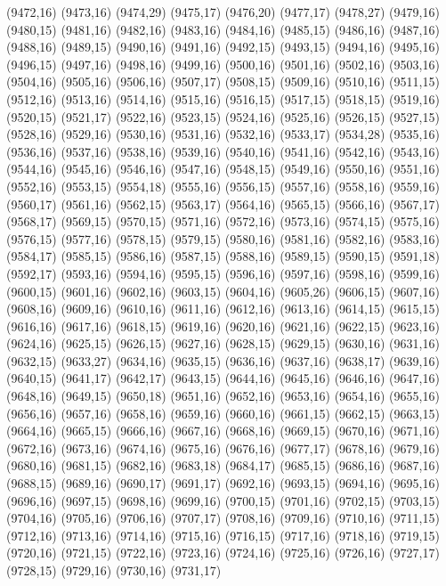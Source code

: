 (9472,16)
(9473,16)
(9474,29)
(9475,17)
(9476,20)
(9477,17)
(9478,27)
(9479,16)
(9480,15)
(9481,16)
(9482,16)
(9483,16)
(9484,16)
(9485,15)
(9486,16)
(9487,16)
(9488,16)
(9489,15)
(9490,16)
(9491,16)
(9492,15)
(9493,15)
(9494,16)
(9495,16)
(9496,15)
(9497,16)
(9498,16)
(9499,16)
(9500,16)
(9501,16)
(9502,16)
(9503,16)
(9504,16)
(9505,16)
(9506,16)
(9507,17)
(9508,15)
(9509,16)
(9510,16)
(9511,15)
(9512,16)
(9513,16)
(9514,16)
(9515,16)
(9516,15)
(9517,15)
(9518,15)
(9519,16)
(9520,15)
(9521,17)
(9522,16)
(9523,15)
(9524,16)
(9525,16)
(9526,15)
(9527,15)
(9528,16)
(9529,16)
(9530,16)
(9531,16)
(9532,16)
(9533,17)
(9534,28)
(9535,16)
(9536,16)
(9537,16)
(9538,16)
(9539,16)
(9540,16)
(9541,16)
(9542,16)
(9543,16)
(9544,16)
(9545,16)
(9546,16)
(9547,16)
(9548,15)
(9549,16)
(9550,16)
(9551,16)
(9552,16)
(9553,15)
(9554,18)
(9555,16)
(9556,15)
(9557,16)
(9558,16)
(9559,16)
(9560,17)
(9561,16)
(9562,15)
(9563,17)
(9564,16)
(9565,15)
(9566,16)
(9567,17)
(9568,17)
(9569,15)
(9570,15)
(9571,16)
(9572,16)
(9573,16)
(9574,15)
(9575,16)
(9576,15)
(9577,16)
(9578,15)
(9579,15)
(9580,16)
(9581,16)
(9582,16)
(9583,16)
(9584,17)
(9585,15)
(9586,16)
(9587,15)
(9588,16)
(9589,15)
(9590,15)
(9591,18)
(9592,17)
(9593,16)
(9594,16)
(9595,15)
(9596,16)
(9597,16)
(9598,16)
(9599,16)
(9600,15)
(9601,16)
(9602,16)
(9603,15)
(9604,16)
(9605,26)
(9606,15)
(9607,16)
(9608,16)
(9609,16)
(9610,16)
(9611,16)
(9612,16)
(9613,16)
(9614,15)
(9615,15)
(9616,16)
(9617,16)
(9618,15)
(9619,16)
(9620,16)
(9621,16)
(9622,15)
(9623,16)
(9624,16)
(9625,15)
(9626,15)
(9627,16)
(9628,15)
(9629,15)
(9630,16)
(9631,16)
(9632,15)
(9633,27)
(9634,16)
(9635,15)
(9636,16)
(9637,16)
(9638,17)
(9639,16)
(9640,15)
(9641,17)
(9642,17)
(9643,15)
(9644,16)
(9645,16)
(9646,16)
(9647,16)
(9648,16)
(9649,15)
(9650,18)
(9651,16)
(9652,16)
(9653,16)
(9654,16)
(9655,16)
(9656,16)
(9657,16)
(9658,16)
(9659,16)
(9660,16)
(9661,15)
(9662,15)
(9663,15)
(9664,16)
(9665,15)
(9666,16)
(9667,16)
(9668,16)
(9669,15)
(9670,16)
(9671,16)
(9672,16)
(9673,16)
(9674,16)
(9675,16)
(9676,16)
(9677,17)
(9678,16)
(9679,16)
(9680,16)
(9681,15)
(9682,16)
(9683,18)
(9684,17)
(9685,15)
(9686,16)
(9687,16)
(9688,15)
(9689,16)
(9690,17)
(9691,17)
(9692,16)
(9693,15)
(9694,16)
(9695,16)
(9696,16)
(9697,15)
(9698,16)
(9699,16)
(9700,15)
(9701,16)
(9702,15)
(9703,15)
(9704,16)
(9705,16)
(9706,16)
(9707,17)
(9708,16)
(9709,16)
(9710,16)
(9711,15)
(9712,16)
(9713,16)
(9714,16)
(9715,16)
(9716,15)
(9717,16)
(9718,16)
(9719,15)
(9720,16)
(9721,15)
(9722,16)
(9723,16)
(9724,16)
(9725,16)
(9726,16)
(9727,17)
(9728,15)
(9729,16)
(9730,16)
(9731,17)
